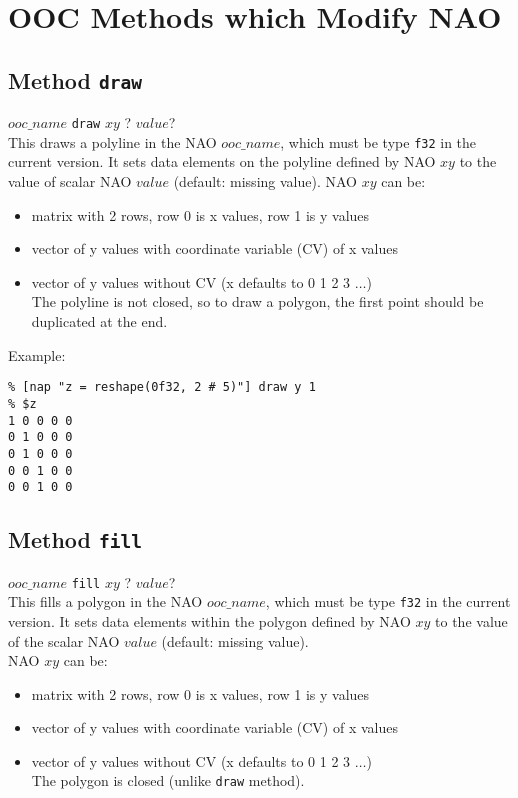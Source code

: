     \section{OOC Methods which Modify NAO}

  \subsection{
    \label{draw}Method \texttt{draw}
  }

  


  $ooc\_name$ 
  \texttt{draw} 
  $xy$ ?
  $value$?
  \\
  

This draws a polyline in the NAO 
  $ooc\_name$, which must be type 
  \texttt{f32} in the current version. It sets data elements on the
  polyline defined by NAO 
  $xy$ to the value of scalar NAO 
  $value$ (default: missing value). NAO 
  $xy$ can be:
  \begin{itemize}
    \item matrix with 2 rows, row 0 is x values, row 1 is y values
    \item vector of y values with coordinate variable (CV) of x
    values
    \item vector of y values without CV (x defaults to 0 1 2 3 $\ldots$)
    \\The polyline is not closed, so to draw a polygon, the first
    point should be duplicated at the end.
  \end{itemize}
  

Example:
  \begin{verbatim}
% [nap "z = reshape(0f32, 2 # 5)"] draw y 1
% $z
1 0 0 0 0
0 1 0 0 0
0 1 0 0 0
0 0 1 0 0
0 0 1 0 0
\end{verbatim}

  \subsection{
    \label{fill}Method \texttt{fill}
  }

  


  $ooc\_name$ 
  \texttt{fill} 
  $xy$ ?
  $value$?
  \\
  

This fills a polygon in the NAO 
  $ooc\_name$, which must be type 
  \texttt{f32} in the current version. It sets data elements within
  the polygon defined by NAO 
  $xy$ to the value of the scalar NAO 
  $value$ (default: missing value).
  \\NAO 
  $xy$ can be:
  \begin{itemize}
    \item matrix with 2 rows, row 0 is x values, row 1 is y values
    \item vector of y values with coordinate variable (CV) of x
    values
    \item vector of y values without CV (x defaults to 0 1 2 3 $\ldots$)
    \\The polygon is closed (unlike 
    \texttt{draw} method).
  \end{itemize}
  

